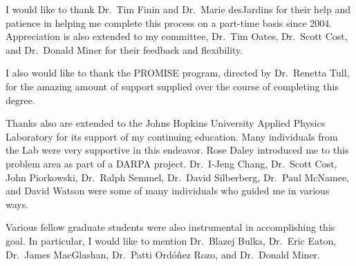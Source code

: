 \pagestyle{plain}

I would like to thank Dr.~Tim Finin and Dr.~Marie desJardins for their help and patience in helping me complete this process on a part-time basis since 2004.  Appreciation is also extended to my committee, Dr.~Tim Oates, Dr.~Scott Cost, and Dr.~Donald Miner for their feedback and flexibility.

I also would like to thank the PROMISE program, directed by Dr.~Renetta Tull, for the amazing amount of support supplied over the course of completing this degree.

Thanks also are extended to the Johns Hopkins University Applied Physics Laboratory for its support of my continuing education.  Many individuals from the Lab were very supportive in this endeavor.  Rose Daley introduced me to this problem area as part of a DARPA project.  Dr.~I-Jeng Chang, Dr.~Scott Cost, John Piorkowski, Dr.~Ralph Semmel, Dr.~David Silberberg, Dr.~Paul McNamee, and David Watson were some of many individuals who guided me in various ways.

Various fellow graduate students were also instrumental in accomplishing this goal.  In particular, I would like to mention Dr.~Blazej Bulka, Dr.~Eric Eaton, Dr.~James MacGlashan, Dr.~Patti Ord\'{o}\~{n}ez Rozo, and Dr.~Donald Miner.
